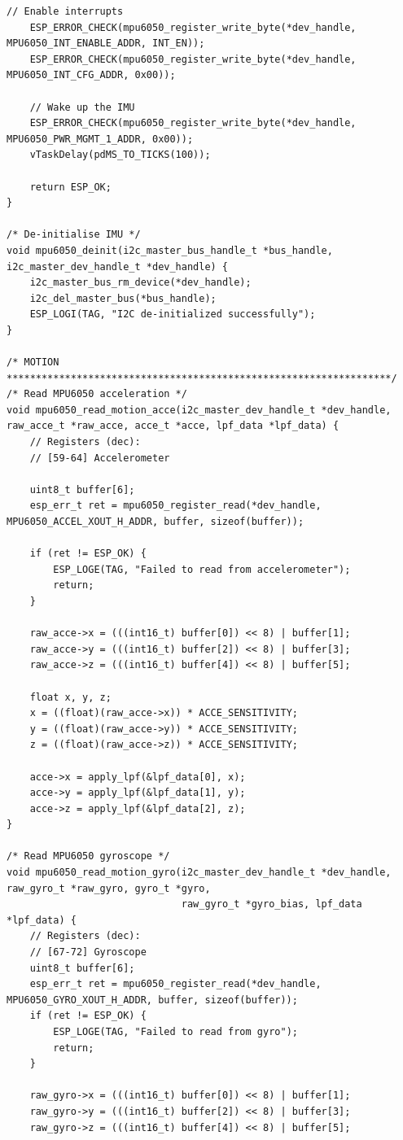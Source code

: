 \begin{lstlisting}[caption={sensors.c}]
    // Enable interrupts
    ESP_ERROR_CHECK(mpu6050_register_write_byte(*dev_handle, MPU6050_INT_ENABLE_ADDR, INT_EN));
    ESP_ERROR_CHECK(mpu6050_register_write_byte(*dev_handle, MPU6050_INT_CFG_ADDR, 0x00));

    // Wake up the IMU
    ESP_ERROR_CHECK(mpu6050_register_write_byte(*dev_handle, MPU6050_PWR_MGMT_1_ADDR, 0x00));
    vTaskDelay(pdMS_TO_TICKS(100)); 

    return ESP_OK;
}

/* De-initialise IMU */
void mpu6050_deinit(i2c_master_bus_handle_t *bus_handle, i2c_master_dev_handle_t *dev_handle) {
    i2c_master_bus_rm_device(*dev_handle);
    i2c_del_master_bus(*bus_handle);
    ESP_LOGI(TAG, "I2C de-initialized successfully");
}

/* MOTION ******************************************************************/
/* Read MPU6050 acceleration */
void mpu6050_read_motion_acce(i2c_master_dev_handle_t *dev_handle, raw_acce_t *raw_acce, acce_t *acce, lpf_data *lpf_data) {
    // Registers (dec):
    // [59-64] Accelerometer

    uint8_t buffer[6];
    esp_err_t ret = mpu6050_register_read(*dev_handle, MPU6050_ACCEL_XOUT_H_ADDR, buffer, sizeof(buffer));

    if (ret != ESP_OK) {
        ESP_LOGE(TAG, "Failed to read from accelerometer");
        return;
    }
    
    raw_acce->x = (((int16_t) buffer[0]) << 8) | buffer[1];
    raw_acce->y = (((int16_t) buffer[2]) << 8) | buffer[3];
    raw_acce->z = (((int16_t) buffer[4]) << 8) | buffer[5];
    
    float x, y, z; 
    x = ((float)(raw_acce->x)) * ACCE_SENSITIVITY;
    y = ((float)(raw_acce->y)) * ACCE_SENSITIVITY;
    z = ((float)(raw_acce->z)) * ACCE_SENSITIVITY;

    acce->x = apply_lpf(&lpf_data[0], x);
    acce->y = apply_lpf(&lpf_data[1], y);
    acce->z = apply_lpf(&lpf_data[2], z);
}

/* Read MPU6050 gyroscope */
void mpu6050_read_motion_gyro(i2c_master_dev_handle_t *dev_handle, raw_gyro_t *raw_gyro, gyro_t *gyro,
                              raw_gyro_t *gyro_bias, lpf_data *lpf_data) {
    // Registers (dec):
    // [67-72] Gyroscope
    uint8_t buffer[6];
    esp_err_t ret = mpu6050_register_read(*dev_handle, MPU6050_GYRO_XOUT_H_ADDR, buffer, sizeof(buffer));
    if (ret != ESP_OK) {
        ESP_LOGE(TAG, "Failed to read from gyro");
        return;
    }

    raw_gyro->x = (((int16_t) buffer[0]) << 8) | buffer[1];
    raw_gyro->y = (((int16_t) buffer[2]) << 8) | buffer[3];
    raw_gyro->z = (((int16_t) buffer[4]) << 8) | buffer[5];
    

\end{lstlisting}
